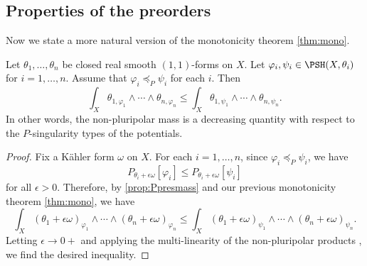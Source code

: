 \subsection{Properties of the preorders}
\label{subsec:preorder_prop}

Now we state a more natural version of the monotonicity theorem \cref{thm:mono}.
\begin{proposition}\label{prop:mono2}
    Let $\theta_1,\ldots,\theta_n$ be closed real smooth $(1,1)$-forms on $X$.
    Let $\varphi_i,\psi_i\in \PSH(X,\theta_i)$ for $i=1,\ldots,n$. Assume that $\varphi_i\preceq_P \psi_i$ for each $i$. Then
    \[
        \int_X \theta_{1,\varphi_1}\wedge \cdots \wedge  \theta_{n,\varphi_n}\leq \int_X \theta_{1,\psi_1}\wedge \cdots \wedge  \theta_{n,\psi_n}.
    \]
    In other words, the non-pluripolar mass is a decreasing quantity with respect to the $P$-singularity types of the potentials.
\end{proposition}
\begin{proof}
    Fix a Kähler form $\omega$ on $X$. For each $i=1,\ldots,n$, since $\varphi_i\preceq_P\psi_i$, we have
    \[
        P_{\theta_i+\epsilon\omega}[\varphi_i]\leq P_{\theta_i+\epsilon\omega}[\psi_i]
    \]
    for all $\epsilon>0$. Therefore, by \cref{prop:Ppresmass} and our previous monotonicity theorem \cref{thm:mono}, we have
    \[
        \int_X (\theta_1+\epsilon\omega)_{\varphi_1}\wedge \cdots \wedge (\theta_n+\epsilon\omega)_{\varphi_n}\leq \int_X (\theta_1+\epsilon\omega)_{\psi_1}\wedge \cdots \wedge (\theta_n+\epsilon\omega)_{\psi_n}.
    \]
    Letting $\epsilon\to 0+$ and applying the multi-linearity of the non-pluripolar products , we find the desired inequality.
\end{proof}

